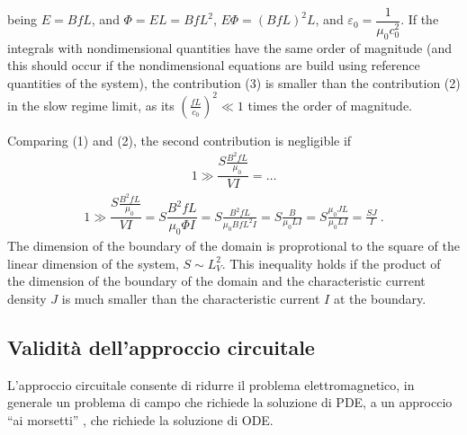 \documentclass[letterpaper,10pt,english]{jupyterBook}
\begin{document}
\sphinxAtStartPar
being \(E = B f L\), and \(\Phi = E L = B f L^2\), \(E \Phi = (B f L)^2 L\), and \(\varepsilon_0 = \dfrac{1}{\mu_0 c_0^2}\). If the integrals with non\sphinxhyphen{}dimensional quantities have the same order of magnitude (and this should occur if the non\sphinxhyphen{}dimensional equations are build using reference quantities of the system), the contribution (3) is smaller than the contribution (2) in the slow regime limit, as its \(\left( \frac{f L}{c_0} \right)^2 \ll 1\) times the order of magnitude.

\sphinxAtStartPar
Comparing (1) and (2), the second contribution is negligible if
\begin{equation*}
\begin{split}1 \gg \dfrac{S \frac{B^2 f L}{\mu_0}}{VI} = \dots\end{split}
\end{equation*}
\sphinxAtStartPar
{} 
\begin{equation*}
\begin{split}1 \gg \dfrac{S \frac{B^2 f L}{\mu_0}}{VI} = S \dfrac{B^2 f L}{\mu_0 \Phi I} = S \frac{B^2 f L}{\mu_0 B f L^2 I} = S \frac{B}{\mu_0 L I} = S \frac{\mu_0 J L}{\mu_0 L I} = \frac{S J}{I} \ .\end{split}
\end{equation*}
\sphinxAtStartPar
The dimension of the boundary of the domain is proprotional to the square of the linear dimension of the system, \(S \sim L_{V}^2\). This inequality holds if the product of the dimension of the boundary of the domain and the characteristic current density \(J\) is much smaller than the characteristic current \(I\) at the boundary.



\sphinxstepscope




\subsection{Validità dell’approccio circuitale}
\label{\detokenize{ch/circuits-electric-approximation:validita-dell-approccio-circuitale}}\label{\detokenize{ch/circuits-electric-approximation:classical-electromagnetism-circuits-electric-approximation}}\label{\detokenize{ch/circuits-electric-approximation::doc}}
\sphinxAtStartPar
L’approccio circuitale consente di ridurre il problema elettromagnetico, in generale un problema di campo che richiede la soluzione di PDE, a un approccio “ai morsetti” , che richiede la soluzione di ODE.
\end{document}
